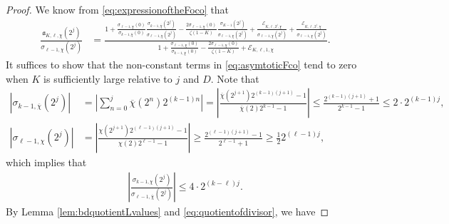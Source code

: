\documentclass[10pt,a4paper]{amsart}
\begin{document}
\begin{proof}
We know from \eqref{eq:expressionoftheFoco}  that
\begin{align}
     \frac{\mathfrak{a}_{K,\ell,\chi}(2^j)}{\sigma_{\ell-1,\chi}(2^j)}&=\frac{1+\frac{\sigma_{\ell-1,\chi}(0)}{\sigma_{k-1,\overline{\chi}}(0)}\frac{\sigma_{k-1,\overline{\chi}}(2^j)}{\sigma_{\ell-1,\chi}(2^j)}-\frac{2\sigma_{\ell-1,\chi}(0)}{\zeta(1-K) }\frac{\sigma_{K-1}(2^j)}{\sigma_{\ell-1,\chi}(2^j)}+\frac{\mathcal{E}_{K,\ell,2^j,\chi}}{\sigma_{\ell-1,\chi}(2^j)}+\frac{\mathscr{E}_{K,\ell,2^j,\chi}}{\sigma_{\ell-1,\chi}(2^j)}}{1+\frac{\sigma_{\ell-1,\chi}(0)}{\sigma_{k-1,\overline{\chi}}(0)}-\frac{2\sigma_{\ell-1,\chi}(0)}{\zeta(1-K) }+\mathscr{E}_{K,\ell,1,\chi}}.\label{eq:asymtoticFco}
\end{align}
It suffices to show that the non-constant terms in \eqref{eq:asymtoticFco} tend to zero when $K$ is sufficiently large relative to $j$ and $D$.
Note that
\begin{align}
    |\sigma_{k-1,\overline{\chi}}(2^j)|&=\left|\sum_{n=0}^j\overline{\chi}(2^n)2^{(k-1)n}\right|=\left|\frac{\overline{\chi}(2^{j+1})2^{(k-1)(j+1)}-1}{\overline{\chi}(2)2^{k-1}-1}\right|\leq\frac{2^{(k-1)(j+1)}+1}{2^{k-1}-1}\leq2\cdot 2^{(k-1)j},  \nonumber\\
    |\sigma_{\ell-1,\chi}(2^j)|&=\left|\frac{\chi(2^{j+1})2^{(\ell-1)(j+1)}-1}{\chi(2)2^{\ell-1}-1}\right|\geq\frac{2^{(\ell-1)(j+1)}-1}{2^{\ell-1}+1}\geq\frac{1}{2}2^{(\ell-1)j},\label{eq:lowerbddivisor}
\end{align}
which implies that 
\begin{align}
    \left|\frac{\sigma_{k-1,\chi}(2^j)}{\sigma_{\ell-1,\overline{\chi}}(2^j)} \right|\leq 4\cdot2^{(k-\ell)j}.\label{eq:quotientofdivisor}
\end{align}
By Lemma \ref{lem:bdquotientLvalues} and \eqref{eq:quotientofdivisor}, we have 

\end{proof}
\end{document}
